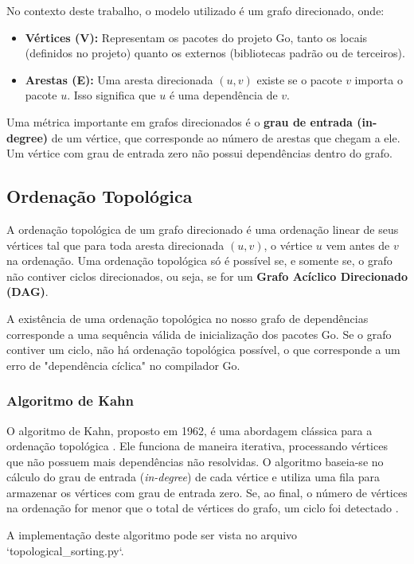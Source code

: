 \documentclass[12pt]{article}
\begin{document}
No contexto deste trabalho, o modelo utilizado é um grafo direcionado, onde:
\begin{itemize}
    \item \textbf{Vértices (V):} Representam os pacotes do projeto Go, tanto os locais (definidos no projeto) quanto os externos (bibliotecas padrão ou de terceiros).
    \item \textbf{Arestas (E):} Uma aresta direcionada $(u, v)$ existe se o pacote $v$ importa o pacote $u$. Isso significa que $u$ é uma dependência de $v$.
\end{itemize}

Uma métrica importante em grafos direcionados é o \textbf{grau de entrada (in-degree)} de um vértice, que corresponde ao número de arestas que chegam a ele. Um vértice com grau de entrada zero não possui dependências dentro do grafo.

\subsection{Ordenação Topológica}
A ordenação topológica de um grafo direcionado é uma ordenação linear de seus vértices tal que para toda aresta direcionada $(u, v)$, o vértice $u$ vem antes de $v$ na ordenação. Uma ordenação topológica só é possível se, e somente se, o grafo não contiver ciclos direcionados, ou seja, se for um \textbf{Grafo Acíclico Direcionado (DAG)}.

A existência de uma ordenação topológica no nosso grafo de dependências corresponde a uma sequência válida de inicialização dos pacotes Go. Se o grafo contiver um ciclo, não há ordenação topológica possível, o que corresponde a um erro de "dependência cíclica" no compilador Go.

\subsubsection{Algoritmo de Kahn}

O algoritmo de Kahn, proposto em 1962, é uma abordagem clássica para a ordenação topológica \cite{kahn1962}. Ele funciona de maneira iterativa, processando vértices que não possuem mais dependências não resolvidas. O algoritmo baseia-se no cálculo do grau de entrada (\textit{in-degree}) de cada vértice e utiliza uma fila para armazenar os vértices com grau de entrada zero. Se, ao final, o número de vértices na ordenação for menor que o total de vértices do grafo, um ciclo foi detectado \cite{kahn1962}.

A implementação deste algoritmo pode ser vista no arquivo `topological{\_}sorting.py`.
\end{document}
